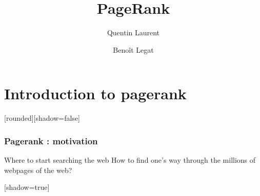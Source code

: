 \documentclass[10pt]{beamer}
\title{PageRank}
\author{
  Quentin Laurent
  \and
  Benoît Legat
}
\begin{document}
\begin{frame}
  \maketitle
\end{frame}
\begin{frame}
\tableofcontents
\end{frame}
\section{Introduction to pagerank}
[rounded][shadow=false]
\begin{frame}
\frametitle{Pagerank : motivation}
	\begin{block}{Where to start searching the web}
	How to find one's way through the millions of webpages of the web?
	\end{block}
\end{frame}
[shadow=true]
\end{document}
